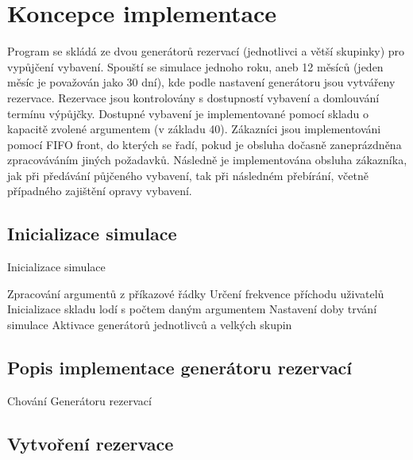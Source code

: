 \documentclass[a4paper, 12pt, hidelinks]{article}
\begin{document}
\section{Koncepce implementace}
Program se skládá ze dvou generátorů rezervací (jednotlivci a větší skupinky) pro vypůjčení vybavení. Spouští se simulace jednoho roku, aneb 12 měsíců (jeden měsíc je považován jako 30 dní), kde podle nastavení generátoru jsou vytvářeny rezervace. Rezervace jsou kontrolovány s dostupností vybavení a domlouvání termínu výpůjčky. Dostupné vybavení je implementované pomocí skladu o kapacitě zvolené argumentem (v základu 40). Zákazníci jsou implementováni pomocí FIFO front, do kterých se řadí, pokud je obsluha dočasně zaneprázdněna zpracováváním jiných požadavků. Následně je implementována obsluha zákazníka, jak při předávání půjčeného vybavení, tak při následném přebírání, včetně případného zajištění opravy vybavení.

\subsection{Inicializace simulace}

\begin{algorithm}[H]
    \caption{Inicializace simulace}\label{alg:initialization}
    \SetAlgoLined
        Zpracování argumentů z příkazové řádky\;
        Určení frekvence příchodu uživatelů\;
        Inicializace skladu lodí s počtem daným argumentem\;
        Nastavení doby trvání simulace\;
        Aktivace generátorů jednotlivců a velkých skupin\;
\end{algorithm}

\subsection{Popis implementace generátoru rezervací}

\begin{algorithm}[H]
    \caption{Chování Generátoru rezervací}\label{alg:reservation_generator}
    \BlankLine
\end{algorithm}

\subsection{Vytvoření rezervace}
\end{document}
